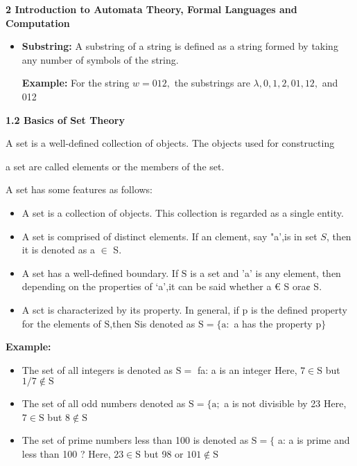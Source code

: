 \documentclass [10pt,a4paper]{book}
\begin{document}
\begin{flushleft}
\textbf{2 Introduction to Automata Theory, Formal Languages and Computation}
\end{flushleft}
\begin{itemize}
\item
\textbf{ Substring:} A substring of a string is defined as a string formed by taking any number of symbols of the string.

\textbf{Example:} For the string $w=012,$ the substrings are $\lambda, 0,1,2,01,12,$ and 012
\end{itemize}

\textbf{1.2 Basics of Set Theory}

A set is a well-defined collection of objects. The objects used for constructing

a set are called elements or the members of the set.


A set has some features as follows:
\begin{itemize}
\item
A set is a collection of objects. This collection is regarded as a single entity.
\item
A set is comprised of distinct elements. If an clement, say "a',is in set $S$, then it is denoted as a $\in$ S.
\item
A set has a well-defined boundary. If $\mathrm{S}$ is a set and 'a' is any element, then depending on the
properties of ‘a’,it can be said whether a € S ora¢ S.
\item
A sct is characterized by its property. In general, if $\mathrm{p}$ is the defined property for the elements of $\mathrm{S}$,then $\mathrm{S}$is denoted as $\mathrm{S}=\{\mathrm{a}:$ a has the property $\mathrm{p}\}$
\end{itemize}

\textbf{Example:}
\begin{itemize}
\item
The set of all integers is denoted as $\mathrm{S}=$ fa: a is an integer Here, $7 \in \mathrm{S}$ but $1 / 7 \notin \mathrm{S}$
\item
The set of all odd numbers denoted as $\mathrm{S}=\{\mathrm{a} ;$ a is not divisible by 23 Here, $7 \in \mathrm{S}$ but $8 \notin \mathrm{S}$
\item
The set of prime numbers less than 100 is denoted as $\mathrm{S}=\{$ a: a is prime and less than 100 ? Here, $23 \in \mathrm{S}$ but 98 or $101 \notin \mathrm{S}$
\end{itemize}
\end{document}
